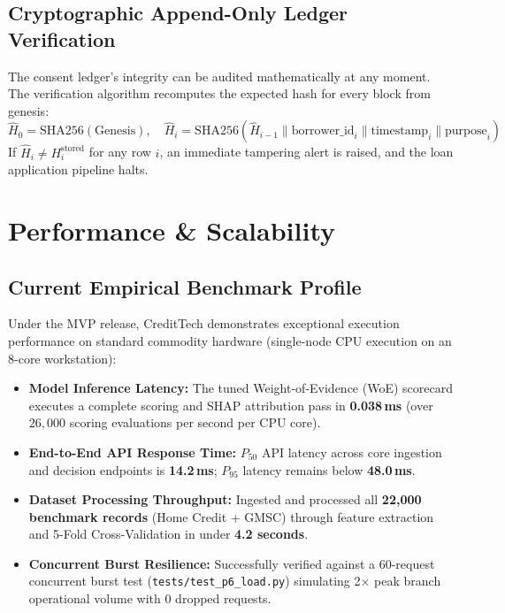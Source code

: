 \documentclass[11pt,a4paper,oneside]{report}
\begin{document}
\section{Cryptographic Append-Only Ledger Verification}
The consent ledger's integrity can be audited mathematically at any moment. The verification algorithm recomputes the expected hash for every block from genesis:
$$\hat{H}_0 = \text{SHA256}(\text{Genesis}), \quad \hat{H}_i = \text{SHA256}\left(\hat{H}_{i-1} \parallel \text{borrower\_id}_i \parallel \text{timestamp}_i \parallel \text{purpose}_i\right)$$
If $\hat{H}_i \neq H_i^{\text{stored}}$ for any row $i$, an immediate tampering alert is raised, and the loan application pipeline halts.




\chapter{Performance \& Scalability}
\label{chap:performance_scalability}

\section{Current Empirical Benchmark Profile}
Under the MVP release, CreditTech demonstrates exceptional execution performance on standard commodity hardware (single-node CPU execution on an 8-core workstation):
\begin{itemize}
  \item \textbf{Model Inference Latency:} The tuned Weight-of-Evidence (WoE) scorecard executes a complete scoring and SHAP attribution pass in \textbf{0.038\,ms} (over $26,000$ scoring evaluations per second per CPU core).
  \item \textbf{End-to-End API Response Time:} $P_{50}$ API latency across core ingestion and decision endpoints is \textbf{14.2\,ms}; $P_{95}$ latency remains below \textbf{48.0\,ms}.
  \item \textbf{Dataset Processing Throughput:} Ingested and processed all \textbf{22,000 benchmark records} (Home Credit + GMSC) through feature extraction and 5-Fold Cross-Validation in under \textbf{4.2 seconds}.
  \item \textbf{Concurrent Burst Resilience:} Successfully verified against a 60-request concurrent burst test (\texttt{tests/test\_p6\_load.py}) simulating 2$\times$ peak branch operational volume with 0 dropped requests.
\end{itemize}
\end{document}
